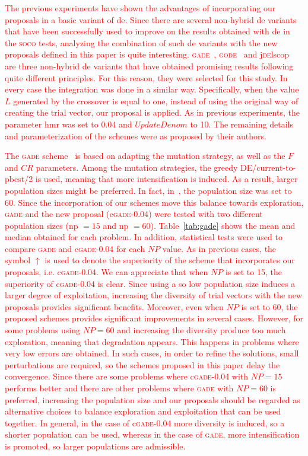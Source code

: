 \documentclass[preprint,3p]{elsarticle}
\newcommand{\DE}{{\sc de}}
\newcommand{\HMR}{{\sc hmr}}
\newcommand{\NP}{{\sc np}}
\begin{document}
\textcolor{red}{
The previous experiments have shown the advantages of incorporating our proposals in a basic
variant of \DE{}.
%
Since there are several non-hybrid \DE{} variants that have been successfully used to improve on the results obtained with \DE{} in the \textsc{soco} tests,
analyzing the combination of such \DE{} variants with the new proposals defined in this paper is quite interesting.
%
\textsc{gade}~\cite{Yang:11}, \textsc{gode}~\cite{Wang:11b} and j\textsc{de}lscop~\cite{Brest:11} are three non-hybrid \DE{} variants that have obtained promising results 
following quite different principles.
%
For this reason, they were selected for this study.
%
In every case the integration was done in a similar way.
%
Specifically, when the value $L$ generated by the crossover is equal to one, instead of using the original way of creating the trial vector,
our proposal is applied.
%
As in previous experiments, the parameter \HMR{} was set to 0.04 and $UpdateDenom$ to 10.
%
The remaining details and parameterization of the schemes were as proposed by their authors.
}

\textcolor{red}{
The \textsc{gade} scheme~\cite{Yang:11} is based on adapting the mutation strategy, as well as the $F$ and $CR$ parameters.
%
Among the mutation strategies, the greedy DE/current-to-pbest/2 is used, meaning that more intensification is induced.
%
As a result, larger population sizes might be preferred. 
%
In fact, in~\cite{Yang:11}, the population size was set to 60.
%
Since the incorporation of our schemes move this balance towards exploration, \textsc{gade} and the new proposal (c\textsc{gade-0.04})
were tested with two different population sizes (\NP{} $= 15$ and \NP{} $= 60$).
%
Table~\ref{tab:gade} shows the mean and median obtained for each problem.
%
In addition, statistical tests were used to compare \textsc{gade} and c\textsc{gade-0.04} for each $NP$ value.
%
As in previous cases, the symbol $\uparrow$ is used to denote the superiority of the scheme that incorporates our proposals, i.e. c\textsc{gade-0.04}.
%
We can appreciate that when $NP$ is set to 15, the superiority of c\textsc{gade-0.04} is clear.
%
Since using a so low population size induces a larger degree of exploitation, increasing the diversity of trial vectors with the new proposals provides significant benefits.
%
Moreover, even when $NP$ is set to 60, the proposed schemes provides significant improvements in several cases.
%
However, for some problems using $NP = 60$ and increasing the diversity produce too much exploration, meaning that degradation appears.
%
This happens in problems where very low errors are obtained.
%
In such cases, in order to refine the solutions, small perturbations are required, so the schemes proposed in this paper delay the convergence.
%
Since there are some problems where c\textsc{gade-0.04} with $NP = 15$ performs better and there are other problems where \textsc{gade} with $NP = 60$ is preferred,
increasing the population size and our proposals should be regarded as alternative choices to balance exploration and exploitation that can be used together.
%
In general, in the case of c\textsc{gade-0.04} more diversity is induced, so a shorter population can be used, whereas in the case of \textsc{gade}, more intensification is promoted, so
larger populations are admissible.
}
\end{document}
